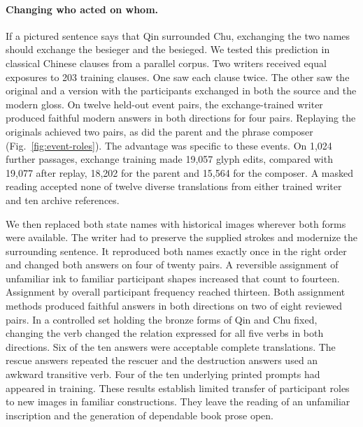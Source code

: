 \paragraph{Changing who acted on whom.}
If a pictured sentence says that Qin surrounded Chu, exchanging the two names should exchange the besieger and the besieged. We tested this prediction in classical Chinese clauses from a parallel corpus. Two writers received equal exposures to 203 training clauses. One saw each clause twice. The other saw the original and a version with the participants exchanged in both the source and the modern gloss. On twelve held-out event pairs, the exchange-trained writer produced faithful modern answers in both directions for four pairs. Replaying the originals achieved two pairs, as did the parent and the phrase composer (Fig.~\ref{fig:event-roles}). The advantage was specific to these events. On 1,024 further passages, exchange training made 19,057 glyph edits, compared with 19,077 after replay, 18,202 for the parent and 15,564 for the composer. A masked reading accepted none of twelve diverse translations from either trained writer and ten archive references.

We then replaced both state names with historical images wherever both forms were available. The writer had to preserve the supplied strokes and modernize the surrounding sentence. It reproduced both names exactly once in the right order and changed both answers on four of twenty pairs. A reversible assignment of unfamiliar ink to familiar participant shapes increased that count to fourteen. Assignment by overall participant frequency reached thirteen. Both assignment methods produced faithful answers in both directions on two of eight reviewed pairs. In a controlled set holding the bronze forms of Qin and Chu fixed, changing the verb changed the relation expressed for all five verbs in both directions. Six of the ten answers were acceptable complete translations. The rescue answers repeated the rescuer and the destruction answers used an awkward transitive verb. Four of the ten underlying printed prompts had appeared in training. These results establish limited transfer of participant roles to new images in familiar constructions. They leave the reading of an unfamiliar inscription and the generation of dependable book prose open.
